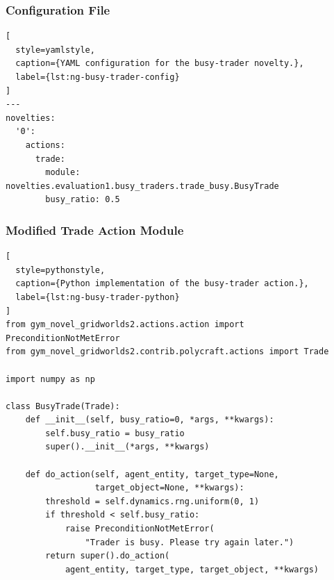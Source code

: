 
\subsubsection{Configuration File}

\begin{lstlisting}[
  style=yamlstyle,
  caption={YAML configuration for the busy-trader novelty.},
  label={lst:ng-busy-trader-config}
]
---
novelties:
  '0':
    actions:
      trade:
        module: novelties.evaluation1.busy_traders.trade_busy.BusyTrade
        busy_ratio: 0.5
\end{lstlisting}

\subsubsection{Modified Trade Action Module}

\begin{lstlisting}[
  style=pythonstyle,
  caption={Python implementation of the busy-trader action.},
  label={lst:ng-busy-trader-python}
]
from gym_novel_gridworlds2.actions.action import PreconditionNotMetError
from gym_novel_gridworlds2.contrib.polycraft.actions import Trade

import numpy as np

class BusyTrade(Trade):
    def __init__(self, busy_ratio=0, *args, **kwargs):
        self.busy_ratio = busy_ratio
        super().__init__(*args, **kwargs)

    def do_action(self, agent_entity, target_type=None,
                  target_object=None, **kwargs):
        threshold = self.dynamics.rng.uniform(0, 1)
        if threshold < self.busy_ratio:
            raise PreconditionNotMetError(
                "Trader is busy. Please try again later.")
        return super().do_action(
            agent_entity, target_type, target_object, **kwargs)
\end{lstlisting}

